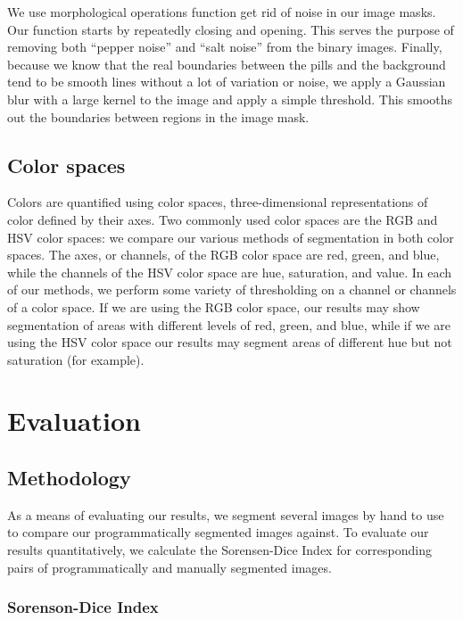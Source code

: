 \documentclass{article}
\begin{document}
We use morphological operations function get rid of noise in our image masks. Our function starts by repeatedly closing and opening. This serves the purpose of removing both ``pepper noise” and ``salt noise” from the binary images. Finally, because we know that the real boundaries between the pills and the background tend to be smooth lines without a lot of variation or noise, we apply a Gaussian blur with a large kernel to the image and apply a simple threshold. This smooths out the boundaries between regions in the image mask.

\subsection{Color spaces}

Colors are quantified using color spaces, three-dimensional representations of color defined by their axes. Two commonly used color spaces are the RGB and HSV color spaces: we compare our various methods of segmentation in both color spaces. The axes, or channels, of the RGB color space are red, green, and blue, while the channels of the HSV color space are hue, saturation, and value. In each of our methods, we perform some variety of thresholding on a channel or channels of a color space. If we are using the RGB color space, our results may show segmentation of areas with different levels of red, green, and blue, while if we are using the HSV color space our results may segment areas of different hue but not saturation (for example).

\section{Evaluation}
\label{results}

\subsection{Methodology}
\label{methodology}

As a means of evaluating our results, we segment several images by hand to use to compare our programmatically segmented images against. To evaluate our results quantitatively, we calculate the Sorensen-Dice Index for corresponding pairs of programmatically and manually segmented images.

\subsubsection{Sorenson-Dice Index}
\end{document}
